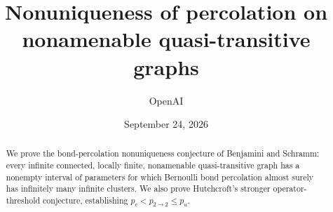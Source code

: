 \documentclass[11pt,a4paper]{article}
\title{Nonuniqueness of percolation on\\
nonamenable quasi-transitive graphs}
\author{OpenAI}
\date{September 24, 2026}
\theoremstyle{definition}
\theoremstyle{remark}
\numberwithin{equation}{section}
\begin{document}
\maketitle
\begin{abstract}
We prove the bond-percolation nonuniqueness conjecture of Benjamini and
Schramm: every infinite connected, locally finite, nonamenable quasi-transitive
graph has a nonempty interval of parameters for which Bernoulli bond
percolation almost surely has infinitely many infinite clusters. We also prove
Hutchcroft's stronger operator-threshold conjecture, establishing
$p_c<p_{2\to2}\le p_u$.
\end{abstract}
\clearpage
\begingroup
\small
\tableofcontents
\endgroup
\clearpage










\begingroup
\small


\endgroup
\end{document}
